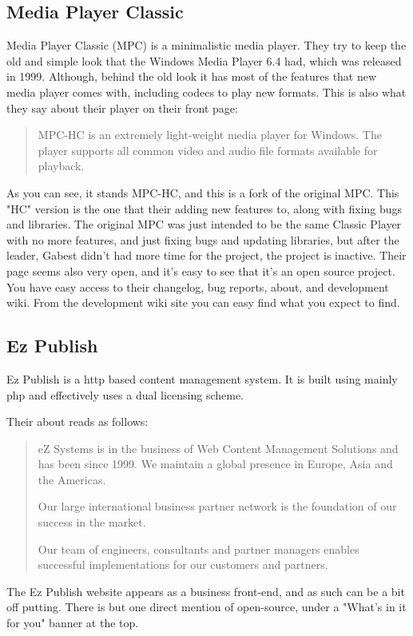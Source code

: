 \documentclass{report} %
\begin{document}
\subsection{Media Player Classic}
Media Player Classic (MPC) is a minimalistic media player. They try to keep the old and simple look that the Windows Media Player 6.4 had, which was released in 1999. Although, behind the old look it has most of the features that new media player comes with, including codecs to play new formats. 
This is also what they say about their player on their front page:
\begin{quote}
MPC-HC is an extremely light-weight media player for Windows.
The player supports all common video and audio file formats available for playback.\cite{mpcweb}
\end{quote}
As you can see, it stands MPC-HC, and this is a fork of the original MPC. This "HC" version is the one that their adding new features to, along with fixing bugs and libraries. The original MPC was just intended to be the same Classic Player with no more features, and just fixing bugs and updating libraries, but after the leader, Gabest didn't had more time for the project, the project is inactive. %
Their page seems also very open, and it's easy to see that it's an open source project. You have easy access to their changelog, bug reports, about, and development wiki. From the development wiki site you can easy find what you expect to find.
 
\subsection{Ez Publish}
Ez Publish is a http based content management system. It is built using mainly php and effectively uses a dual licensing scheme.

Their about reads as follows:
\begin{quote}
eZ Systems is in the business of Web Content Management Solutions and has been since 1999. We maintain a global presence in Europe, Asia and the Americas. 

Our large international business partner network is the foundation of our success in the market. 

Our team of engineers, consultants and partner managers enables successful implementations for our customers and partners.\cite{ezpubwebabout}
\end{quote}
The Ez Publish website\cite{ezpubweb} appears as a business front-end, and as such can be a bit off putting. There is but one direct mention of open-source, under a "What's in it for you" banner at the top.
\end{document}
